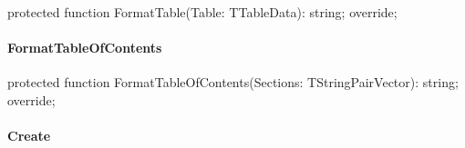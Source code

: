 \documentclass{report}
\newif\ifpdf
\begin{document}
\label{PasDoc_GenHtml.TGenericHTMLDocGenerator-FormatTable}
\begin{list}{}{
\setlength{\itemindent}{0cm}
\setlength{\listparindent}{0cm}
\setlength{\leftmargin}{\evensidemargin}
\addtolength{\leftmargin}{\tmplength}
\settowidth{\labelsep}{X}
\addtolength{\leftmargin}{\labelsep}
\setlength{\labelwidth}{\tmplength}
}
\item[\textbf{Declaration}\hfill]
\ifpdf
\begin{flushleft}
\fi
\begin{ttfamily}
protected function FormatTable(Table: TTableData): string; override;\end{ttfamily}

\ifpdf
\end{flushleft}
\fi

\end{list}
\paragraph*{FormatTableOfContents}\hspace*{\fill}

\label{PasDoc_GenHtml.TGenericHTMLDocGenerator-FormatTableOfContents}
\begin{list}{}{
\setlength{\itemindent}{0cm}
\setlength{\listparindent}{0cm}
\setlength{\leftmargin}{\evensidemargin}
\addtolength{\leftmargin}{\tmplength}
\settowidth{\labelsep}{X}
\addtolength{\leftmargin}{\labelsep}
\setlength{\labelwidth}{\tmplength}
}
\item[\textbf{Declaration}\hfill]
\ifpdf
\begin{flushleft}
\fi
\begin{ttfamily}
protected function FormatTableOfContents(Sections: TStringPairVector): string; override;\end{ttfamily}

\ifpdf
\end{flushleft}
\fi

\end{list}
\paragraph*{Create}\hspace*{\fill}
\end{document}

